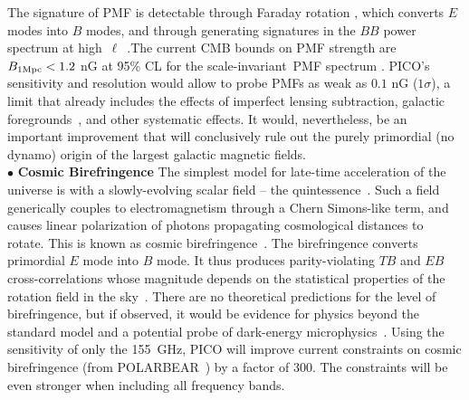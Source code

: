 \documentclass[PICOReport.tex]{subfiles}
\begin{document}
The signature of PMF is detectable through Faraday rotation \cite{Kosowsky:1996yc}, which converts $E$ modes into $B$ modes, and through generating signatures in the $BB$ power spectrum at high~$\ell$~\cite{Lewis:2004ef}.The current CMB bounds on PMF strength are $B_{\rm 1Mpc}<1.2$ nG at 95\% CL for the scale-invariant~PMF spectrum \cite{Zucca:2016iur}. PICO's sensitivity and resolution would allow to probe PMFs as weak as $0.1$ nG ($1\sigma$), a limit that already includes the effects of imperfect lensing subtraction, galactic foregrounds~\cite{Oppermann:2011td,De:2013dra,Pogosian:2013dya}, and other systematic effects. It would, nevertheless, be an important improvement that will conclusively rule out the purely primordial (no dynamo) origin of the largest galactic magnetic fields. \\
%
$\bullet$ {\bf Cosmic Birefringence} \hspace{0.1in}
The simplest model for late-time acceleration of the universe is with a slowly-evolving scalar field -- the quintessence~\cite{Carroll:1998zi}. Such a field generically couples to electromagnetism through a Chern Simons-like term, and causes linear polarization of photons propagating cosmological distances to rotate. This is known as cosmic birefringence~\cite{Carroll:1998zi}. The birefringence converts primordial $E$ mode into $B$ mode. It thus produces parity-violating $TB$ and $EB$ cross-correlations whose magnitude depends on the statistical properties of the rotation field in the sky~\cite{Kamionkowski:2008fp,Gluscevic:2009mm}. There are no theoretical predictions for the level of birefringence, but if observed, it would be evidence for physics beyond the standard model and a potential probe of dark-energy microphysics~\citep{Gluscevic:2009mm,Caldwell:2011,yadav2009}. Using the sensitivity of only the 155~GHz, PICO will improve current constraints on cosmic birefringence (from POLARBEAR~\cite{Ade:2015cao}) by a factor of 300. The constraints will be even stronger when including all frequency bands.
\end{document}
